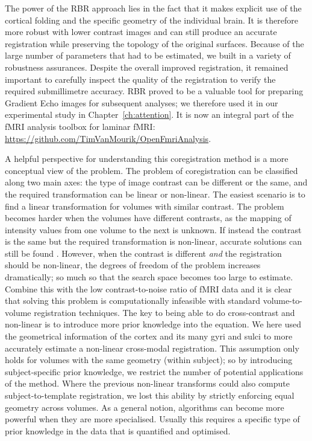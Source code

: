 The power of the RBR approach lies in the fact that it makes explicit use of the cortical folding and the specific geometry of the individual brain. It is therefore more robust with lower contrast images and can still produce an accurate registration while preserving the topology of the original surfaces. Because of the large number of parameters that had to be estimated, we built in a variety of robustness assurances. Despite the overall improved registration, it remained important to carefully inspect the quality of the registration to verify the required submillimetre accuracy. RBR proved to be a valuable tool for preparing Gradient Echo images for subsequent analyses; we therefore used it in our experimental study in Chapter~\ref{ch:attention}. It is now an integral part of the fMRI analysis toolbox for laminar fMRI: \url{https://github.com/TimVanMourik/OpenFmriAnalysis}.

A helpful perspective for understanding this coregistration method is a more conceptual view of the problem. The problem of coregistration can be classified along two main axes: the type of image contrast can be different or the same, and the required transformation can be linear or non-linear. The easiest scenario is to find a linear transformation for volumes with similar contrast. The problem becomes harder when the volumes have different contrasts, as the mapping of intensity values from one volume to the next is unknown. If instead the contrast is the same but the required transformation is non-linear, accurate solutions can still be found \cite{Collins1995}. However, when the contrast is different \emph{and} the registration should be non-linear, the degrees of freedom of the problem increases dramatically; so much so that the search space becomes too large to estimate. Combine this with the low contrast-to-noise ratio of fMRI data and it is clear that solving this problem is computationally infeasible with standard volume-to-volume registration techniques. The key to being able to do cross-contrast and non-linear is to introduce more prior knowledge into the equation. We here used the geometrical information of the cortex and its many gyri and sulci to more accurately estimate a non-linear cross-modal registration. This assumption only holds for volumes with the same geometry (within subject); so by introducing subject-specific prior knowledge, we restrict the number of potential applications of the method. Where the previous non-linear transforms could also compute subject-to-template registration, we lost this ability by strictly enforcing equal geometry across volumes. As a general notion, algorithms can become more powerful when they are more specialised. Usually this requires a specific type of prior knowledge in the data that is quantified and optimised.

